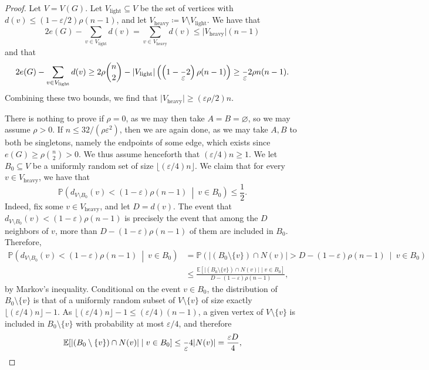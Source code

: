 \documentclass[11pt]{article}
\numberwithin{equation}{section}
\theoremstyle{plain}
\theoremstyle{remark}
\def\E{\mathbb{E}}
\newcommand{\eps}{\ensuremath{\varepsilon}}
\let\emptyset\varnothing
\newcommand\ab[1]{\lvert #1 \rvert}
\newcommand\flo[1]{\lfloor #1 \rfloor}
\renewcommand{\P}{\mathbb{P}}
\begin{document}
\begin{proof}
    Let $V=V(G)$.
    Let $V_{\mathrm{light}}\subseteq V$ be the set of vertices with $d(v)\le (1-\eps/2)\rho (n-1)$, and let $V_{\mathrm{heavy}}\coloneqq V\setminus V_{\mathrm{light}}$. We have that 
    \[
    2e(G) - \sum_{v \in V_{\mathrm{light}}} d(v) = \sum_{v \in V_{\mathrm{heavy}}} d(v) \leq \ab{V_{\mathrm{heavy}}} (n-1)
    \]
    and that
    \[
     2e(G)-\sum_{v\in V_{\mathrm{light}}}d(v) \geq 2\rho \binom n2 - \ab{V_{\mathrm{light}}}\left(\left(1-\frac \eps 2\right) \rho (n-1)\right) \geq \frac \eps 2 \rho n(n-1).
    \]
    Combining these two bounds, we find that $\ab{V_{\mathrm{heavy}}}\geq (\eps \rho/2)n$.

    There is nothing to prove if $\rho=0$, as we may then take $A=B=\emptyset$, so we may assume $\rho>0$.
    If $n\leq 32/(\rho\eps^2)$, then we are again done, as we may take $A,B$ to both be singletons, namely the endpoints of some edge, which exists since $e(G) \geq \rho\binom n2>0$. We thus assume henceforth that $(\eps/4)n\geq 1$.
    We let $B_0\subseteq V$ be a uniformly random set of size $\flo{ (\eps/4)n} $. 
    We claim that for every $v \in V_{\mathrm{heavy}}$, we have that
    \begin{equation}\label{eq:heavy vtx}
        \P\left(d_{V\setminus B_0}(v)< (1-\eps)\rho (n-1) ~\middle|~ v\in B_0\right) \leq \frac 12.
    \end{equation}
    Indeed, fix some $v \in V_{\mathrm{heavy}}$, and let $D=d(v)$. The event that $d_{V \setminus B_0}(v) < (1-\varepsilon)\rho(n-1)$ is precisely the event that among the $D$ neighbors of $v$, more than $D-(1-\varepsilon)\rho(n-1)$ of them are included in $B_0$. Therefore,
    \begin{align*}
       \P\left(d_{V\setminus B_0}(v)< (1-\eps)\rho (n-1) ~\middle|~ v\in B_0\right) &= \P\left(\ab{(B_0 \setminus \{v\}) \cap N(v)}>D-(1-\varepsilon)\rho(n-1) ~\middle|~ v \in B_0\right)\\
        &\leq \frac{\E[\ab{(B_0 \setminus \{v\})\cap N(v)} \mid v \in B_0]}{D-(1-\varepsilon)\rho(n-1)},
    \end{align*}
    by Markov's inequality. 
    Conditional on the event $v \in B_0$, the distribution of $B_0 \setminus\{v\}$ is that of a uniformly random subset of $V \setminus \{v\}$ of size exactly $\flo{(\varepsilon/4)n}-1$.
    As $\flo{(\eps/4)n}-1 \leq (\eps/4)(n-1)$, a given vertex of $V \setminus \{v\}$ is included in $B_0 \setminus \{v\}$ with probability at most $\eps/4$, and therefore
    \[
    \E[\ab{(B_0 \setminus \{v\})\cap N(v)} \mid v \in B_0] \leq \frac \eps 4 \ab{N(v)} = \frac{\eps D}{4},
\]
\end{proof}
\end{document}
